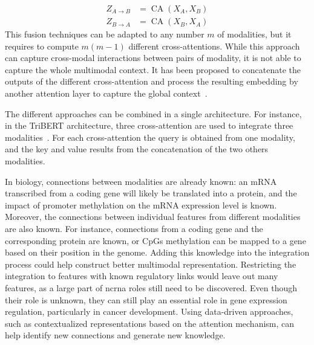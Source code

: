 \documentclass[../main.tex]{subfiles}
\begin{document}
\begin{description}[%
			style=multiline,
			leftmargin=!,
			labelwidth=3cm,
		]
			\setlength{\belowdisplayshortskip}{0pt}
			\begin{align*}
				Z_{A \rightarrow B} & = \operatorname{CA}\left(X_A, X_B \right) \\
				Z_{B \rightarrow A} & = \operatorname{CA}\left(X_B, X_A \right)
			\end{align*} %
			\endgroup
			This fusion techniques can be adapted to any number \(m\) of modalities, but it requires to compute \(m\left(m-1\right)\) different cross-attentions.
			While this approach can capture cross-modal interactions between pairs of modality, it is not able to capture the whole multimodal context.
			It has been proposed to concatenate the outputs of the different cross-attention and process the resulting embedding by another attention layer to capture the global context~\cite{tsai-etal-2019-multimodal}.
	\end{description}
	The different approaches can be combined in a single architecture.
	For instance, in the TriBERT architecture, three cross-attention are used to integrate three modalities~\cite{TriBERT}.
	For each cross-attention the query is obtained from one modality, and the key and value results from the concatenation of the two others modalities.

	In biology, connections between modalities are already known: an mRNA transcribed from a coding gene will likely be translated into a protein, and the impact of promoter methylation on the mRNA expression level is known.
	Moreover, the connections between individual features from different modalities are also known.
	For instance, connections from a coding gene and the corresponding protein are known, or CpGs methylation can be mapped to a gene based on their position in the genome.
	Adding this knowledge into the integration process could help construct better multimodal representation.
	Restricting the integration to features with known regulatory links would leave out many features, as a large part of \gls{ncrna} roles still need to be discovered.
	Even though their role is unknown, they can still play an essential role in gene expression regulation, particularly in cancer development.
	Using data-driven approaches, such as contextualized representations based on the attention mechanism, can help identify new connections and generate new knowledge.
\end{document}
